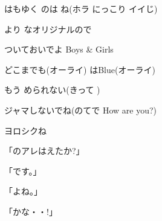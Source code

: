 \documentclass[14pt]{extreport}
\begin{document}
{  はもゆく のは ね(ホラ にっこり イイじ)
  \jisho{}

  より なオリジナルので
  \jisho{}

  ついておいでよ Boys \& Girls
  \jisho{}

  どこまでも(オーライ) はBlue(オーライ)
  \jisho{}

  もう められない(きって )
  \jisho{}

  ジャマしないでね(のてで How are you?)
  \jisho{}

  ヨロシクね
  \jisho{}

\item
  「のアレはえたか?」
  \jisho{}

  「です。」
  \jisho{}

  「よね。」
  \jisho{}

  「かな・・!」
  \jisho{}

}
\end{document}
